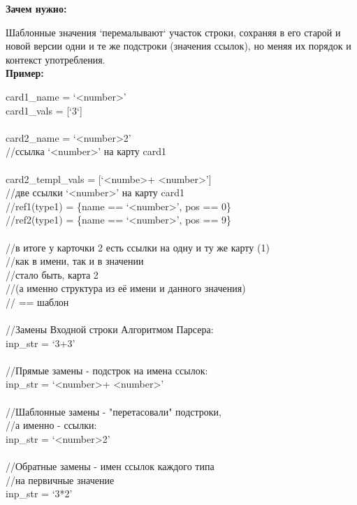 \documentclass{book}
\newcommand{\less}{\textless}
\newcommand{\more}{\textgreater}
\begin{document}
\textbf{Зачем нужно:}

Шаблонные значения `перемалывают` участок строки, сохраняя в его старой и новой версии одни и те же подстроки (значения ссылок), но меняя их порядок и контекст употребления.\\

\textbf{Пример:}

\begin{tcolorbox}[breakable]
card1\_name = `\less number\more' \\
card1\_vals = [`3`] \\
\\
card2\_name = `\less number\more*2' \\
//ссылка `\less number\more' на карту card1 \\
\\
card2\_templ\_vals = [`\less numbe\more + \less number\more'] \\
//две ссылки `\less number>' на карту card1 \\
//ref1(type1) = \{name == `\less number\more', pos == 0\} \\
//ref2(type1) = \{name == `\less number\more', pos == 9\} \\
\\
//в итоге у карточки 2 есть ссылки на одну и ту же карту (1) \\
//как в имени, так и в значении \\
//стало быть, карта 2 \\
//(а именно структура из её имени и данного значения) \\
// == шаблон \\
\\
//Замены Входной строки Алгоритмом Парсера: \\
inp\_str = `3+3' \\
\\
//Прямые замены - подстрок на имена ссылок: \\
inp\_str = `\less number\more + \less number\more' \\
\\
//Шаблонные замены - "перетасовали" подстроки, \\
//а именно - ссылки: \\
inp\_str = `\less number\more*2' \\
\\
//Обратные замены - имен ссылок каждого типа \\
//на первичные значение \\
inp\_str = `3*2'
\end{tcolorbox}
\end{document}
